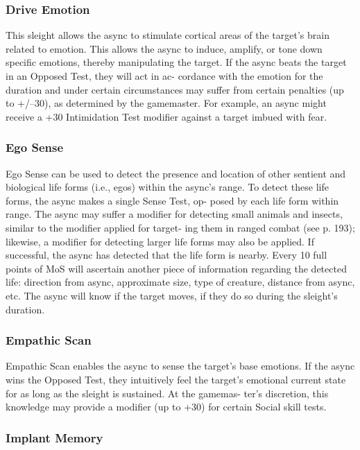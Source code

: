 \subsubsection{Drive Emotion}

This sleight allows the async to stimulate cortical areas 
of the target's brain related to emotion. This allows 
the async to induce, amplify, or tone down specific 
emotions, thereby manipulating the target. If the async 
beats the target in an Opposed Test, they will act in ac-
cordance with the emotion for the duration and under 
certain circumstances may suffer from certain penalties 
(up to +/–30), as determined by the gamemaster. For 
example, an async might receive a +30 Intimidation 
Test modifier against a target imbued with fear.

\subsubsection{Ego Sense}

Ego Sense can be used to detect the presence and 
location of other sentient and biological life forms 
(i.e., egos) within the async's range. To detect these 
life forms, the async makes a single Sense Test, op-
posed by each life form within range. The async may 
suffer a modifier for detecting small animals and 
insects, similar to the modifier applied for target-
ing them in ranged combat (see p. 193); likewise, a 
modifier for detecting larger life forms may also be 
applied. If successful, the async has detected that the 
life form is nearby. Every 10 full points of MoS will 
ascertain another piece of information regarding the 
detected life: direction from async, approximate size, 
type of creature, distance from async, etc. The async 
will know if the target moves, if they do so during the 
sleight's duration.

\subsubsection{Empathic Scan}

Empathic Scan enables the async to sense the target's 
base emotions. If the async wins the Opposed Test, 
they intuitively feel the target's emotional current state 
for as long as the sleight is sustained. At the gamemas-
ter's discretion, this knowledge may provide a modifier 
(up to +30) for certain Social skill tests.

\subsubsection{Implant Memory}

